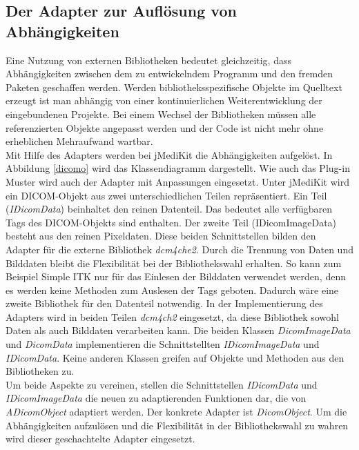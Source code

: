 \subsection{Der Adapter zur Auflösung von Abhängigkeiten}

Eine Nutzung von externen Bibliotheken bedeutet gleichzeitig, dass Abhängigkeiten zwischen dem zu entwickelndem Programm und den fremden Paketen geschaffen werden. Werden bibliotheksspezifische Objekte im Quelltext erzeugt ist man abhängig von einer kontinuierlichen Weiterentwicklung der eingebundenen Projekte. Bei einem Wechsel der Bibliotheken müssen alle referenzierten Objekte angepasst werden und der Code ist nicht mehr ohne erheblichen Mehraufwand wartbar.\\
Mit Hilfe des Adapters werden bei jMediKit die Abhängigkeiten aufgelöst. In Abbildung \ref{dicomo} wird das Klassendiagramm dargestellt. Wie auch das Plug-in Muster wird auch der Adapter mit Anpassungen eingesetzt. Unter jMediKit wird ein DICOM-Objekt aus zwei unterschiedlichen Teilen repräsentiert. Ein Teil (\textit{IDicomData}) beinhaltet den reinen Datenteil. Das bedeutet alle verfügbaren Tags des DICOM-Objekts sind enthalten. Der zweite Teil (IDicomImageData) besteht aus den reinen Pixeldaten. Diese beiden Schnittstellen bilden den Adapter für die externe Bibliothek \textit{dcm4che2}. Durch die Trennung von Daten und Bilddaten bleibt die Flexibilität bei der Bibliothekswahl erhalten. So kann zum Beispiel Simple ITK nur für das Einlesen der Bilddaten verwendet werden, denn es werden keine Methoden zum Auslesen der Tags geboten. Dadurch wäre eine zweite Bibliothek für den Datenteil notwendig. In der Implementierung des Adapters wird in beiden Teilen \textit{dcm4ch2} eingesetzt, da diese Bibliothek sowohl Daten als auch Bilddaten verarbeiten kann. Die beiden Klassen \textit{DicomImageData} und \textit{DicomData} implementieren die Schnittstellten \textit{IDicomImageData} und \textit{IDicomData}. Keine anderen Klassen greifen auf Objekte und Methoden aus den Bibliotheken zu.\\
Um beide Aspekte zu vereinen, stellen die Schnittstellen \textit{IDicomData} und \textit{IDicomImageData} die neuen zu adaptierenden Funktionen dar, die von \textit{ADicomObject} adaptiert werden. Der konkrete Adapter ist \textit{DicomObject}. Um die Abhängigkeiten aufzulösen und die Flexibilität in der Bibliothekswahl zu wahren wird dieser geschachtelte Adapter eingesetzt.

